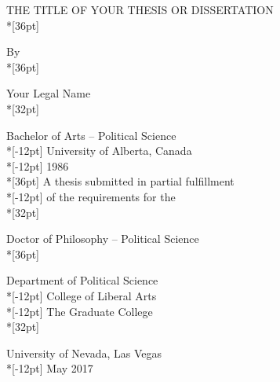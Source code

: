 \thispagestyle{empty}%

\begin{center}
 THE TITLE OF YOUR THESIS OR DISSERTATION\\*[36pt]

\normalsize By\\*[36pt]

 Your Legal Name\\*[32pt] 

 Bachelor of Arts -- Political Science\\*[-12pt] 
 University of Alberta, Canada\\*[-12pt]
 1986\\*[36pt]
 A thesis submitted in partial fulfillment\\*[-12pt]
 of the requirements for the\\*[32pt]

 Doctor of Philosophy -- Political Science\\*[36pt]
 
 Department of Political Science\\*[-12pt]
 College of Liberal Arts \\*[-12pt]
 The Graduate College\\*[32pt]

 University of Nevada, Las Vegas\\*[-12pt]
 May 2017
\end{center}
